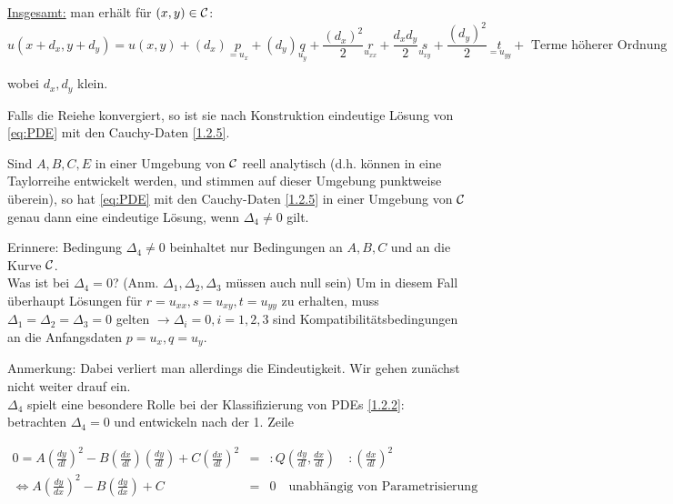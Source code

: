 \underline{Insgesamt:} man erhält für $(x,y) \in \mathcal{C}$:
\begin{equation}%
    u\left( x+d_x, y+d_y \right) = u(x,y) + (d_x) \underset{=u_x}{p} + (d_y)\underset{u_y}{q} + \frac{(d_x)^2}{2} \underset{u_{xx}}{r} + \frac{d_x d_y}{2} \underset{u_{xy}}{s} + \frac{(d_y)^2}{2} \underset{=u_{yy}}{t} + \text{ Terme höherer Ordnung}
    \label{}
\end{equation}

wobei $d_x, d_y$ klein. 

Falls die Reiehe konvergiert, so ist sie nach Konstruktion eindeutige Lösung von \eqref{eq:PDE} mit den Cauchy-Daten \ref{1.2.5}.

\begin{satz}
    Sind $A,B,C,E$ in einer Umgebung von $\mathcal{C}$ reell analytisch (d.h. können in eine Taylorreihe entwickelt werden, und stimmen auf dieser Umgebung punktweise überein), so hat \eqref{eq:PDE} mit den Cauchy-Daten \ref{1.2.5} in einer Umgebung von $\mathcal{C}$ genau dann eine eindeutige Lösung, wenn $\Delta_4 \neq 0$ gilt.
    
\end{satz}

Erinnere: Bedingung $\Delta_4 \neq 0$ beinhaltet nur Bedingungen an $A,B,C$ und an die Kurve $\mathcal{C}$.\\
Was ist bei $\Delta_4 = 0$? (Anm. $\Delta_1, \Delta_2, \Delta_3$ müssen auch null sein)
Um in diesem Fall überhaupt Lösungen für $r=u_{xx}, s=u_{xy}, t=u_{yy}$ zu erhalten, muss $\Delta_1 = \Delta_2 = \Delta_3 = 0$ gelten $\to \Delta_i = 0, i=1,2,3$ sind Kompatibilitätsbedingungen an die Anfangsdaten $p=u_x, q=u_y$. 

Anmerkung: Dabei verliert man allerdings die Eindeutigkeit. Wir gehen zunächst nicht weiter drauf ein.\\

$\Delta_4$ spielt eine besondere Rolle bei der Klassifizierung von PDEs \ref{1.2.2}:\\
betrachten $\Delta_4 = 0$ und entwickeln nach der 1. Zeile

\begin{eqnarray} %
    0 = A \left( \frac{dy}{dl} \right)^2 - B \left( \frac{dx}{dl} \right) \left( \frac{dy}{dl} \right) + C \left( \frac{dx}{dl} \right)^2 &=&: Q\left( \frac{dy}{dl}, \frac{dx}{dl} \right) \quad :\left( \frac{dx}{dl} \right)^2\\
    \Leftrightarrow A \left( \frac{dy}{dx} \right)^2 - B \left( \frac{dy}{dx} \right) + C &=&  0 \quad \text{unabhängig von Parametrisierung}
    \label{eq:Bed}
\end{eqnarray}

